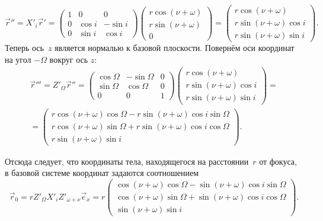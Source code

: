 \begin{equation*}
    \vec r'' = X'_i\vec r' 
    = \begin{pmatrix}
        1 & 0 & 0\\
        0 & \cos i & - \sin i\\
        0 & \sin i & \cos i
    \end{pmatrix}\begin{pmatrix}
        r \cos (\nu + \omega)\\
        r \sin (\nu + \omega)\\
        0
    \end{pmatrix} 
    = \begin{pmatrix}
        r \cos (\nu + \omega)\\
        r \sin (\nu + \omega) \cos i\\
        r \sin (\nu + \omega) \sin i
    \end{pmatrix}.
\end{equation*}
Теперь ось~$z$ является нормалью к базовой плоскости. Повернём оси координат на угол $-\Omega$ вокруг ось $z$:
\begin{multline*}
    \vec r''' = Z'_\Omega\vec r''
    = \begin{pmatrix}
        \cos \Omega & - \sin \Omega & 0\\
        \sin \Omega & \cos \Omega & 0\\
        0 & 0 & 1
    \end{pmatrix}\begin{pmatrix}
        r \cos (\nu + \omega)\\
        r \sin (\nu + \omega) \cos i\\
        r \sin (\nu + \omega) \sin i
    \end{pmatrix} = \\
    = \begin{pmatrix}
        r \cos (\nu + \omega) \cos \Omega - r \sin (\nu + \omega) \cos i \sin \Omega\\
        r \cos (\nu + \omega) \sin \Omega + r \sin (\nu + \omega) \cos i \cos \Omega\\
        r \sin (\nu + \omega) \sin i
    \end{pmatrix}.
\end{multline*}

Отсюда следует, что координаты тела, находящегося на расстоянии~$r$ от фокуса, в базовой системе координат задаются соотношением
\begin{equation*}
    \vec r_0 =
    r Z'_\Omega X'_i Z'_{\omega + \nu} \vec e_x =
    r \begin{pmatrix}
        \cos (\nu + \omega) \cos \Omega - \sin (\nu + \omega) \cos i \sin \Omega\\
        \cos (\nu + \omega) \sin \Omega + \sin (\nu + \omega) \cos i \cos \Omega\\
        \sin (\nu + \omega) \sin i
    \end{pmatrix}.
\end{equation*}








